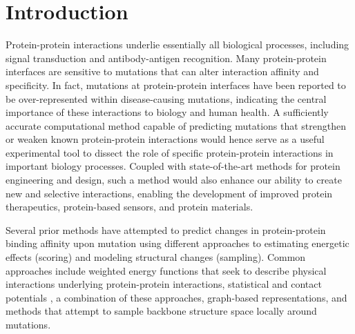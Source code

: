 \section{Introduction}

Protein-protein interactions underlie essentially all biological processes, including signal transduction and antibody-antigen recognition. Many protein-protein interfaces are sensitive to mutations that can alter interaction affinity and specificity.
In fact, mutations at protein-protein interfaces have been reported to be over-represented within disease-causing mutations\cite{jubb_mutations_2017}, indicating the central importance of these interactions to biology and human health.
A sufficiently accurate computational method capable of predicting mutations that strengthen or weaken known protein-protein interactions would hence serve as a useful experimental tool to dissect the role of specific protein-protein interactions in important biology processes. Coupled with state-of-the-art methods for protein engineering and design, such a method would also enhance our ability to create new and selective interactions, enabling the development of improved protein therapeutics, protein-based sensors, and protein materials.

Several prior methods have attempted to predict changes in protein-protein binding affinity upon mutation using different approaches to estimating energetic effects (scoring) and modeling structural changes (sampling). Common approaches include
weighted energy functions that seek to describe physical interactions underlying protein-protein interactions\cite{guerois_predicting_2002,kamisetty_accounting_2011},
statistical and contact potentials \cite{dehouck_beatmusic:_2013,moal_intermolecular_2013,vangone_contacts-based_2015,brender_predicting_2015},
a combination of these approaches\cite{li_predicting_2014},
graph-based representations\cite{pires_mcsm:_2014},
and methods that attempt to sample backbone structure space locally around mutations\cite{dourado_multiscale_2014}.


